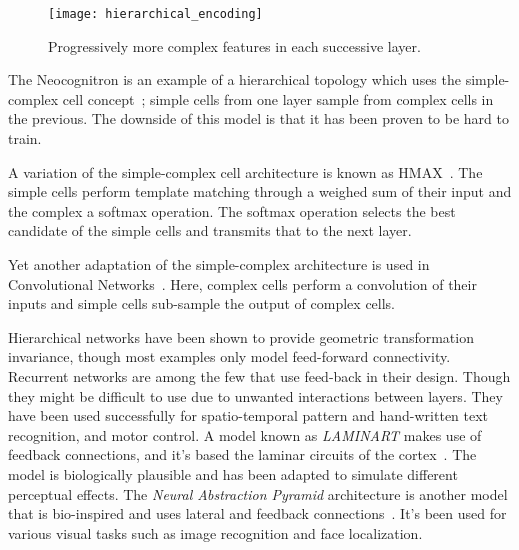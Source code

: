 \begin{figure}[h]
  \begin{center}
    \texttt{[image: hierarchical\_encoding]}
    \caption{Progressively more complex features in each successive layer.}
    \label{fig:vision:hierarchical_encoding}
  \end{center}
\end{figure}

The Neocognitron is an example of a hierarchical topology which uses the simple-complex cell concept~\cite{fukushima1988neocognitron}; simple cells from one layer sample from complex cells in the previous. The downside of this model is that it has been proven to be hard to train.

A variation of the simple-complex cell architecture is known as HMAX~\cite{riesenhuber1999hierarchical}. The simple cells perform template matching through a weighed sum of their input and the complex a softmax operation. The softmax operation selects the best candidate of the simple cells and transmits that to the next layer.

Yet another adaptation of the simple-complex architecture is used in Convolutional Networks~\cite{lecun-1990handwritten}. Here, complex cells perform a convolution of their inputs and simple cells sub-sample the output of complex cells.

Hierarchical networks have been shown to provide geometric transformation invariance, though most examples only model feed-forward connectivity. Recurrent networks are among the few that use feed-back in their design. Though they might be difficult to use due to unwanted interactions between layers. They have been used successfully for spatio-temporal pattern and hand-written text recognition, and motor control. A model known as \emph{LAMINART} makes use of feedback connections, and it's based the laminar circuits of the cortex~\cite{raizada2003laminart}. The model is biologically plausible and has been adapted to simulate different perceptual effects. The \emph{Neural Abstraction Pyramid} architecture is another model that is bio-inspired and uses lateral and feedback connections~\cite{behnke2003hierarchical}. It's been used for various visual tasks such as image recognition and face localization.
